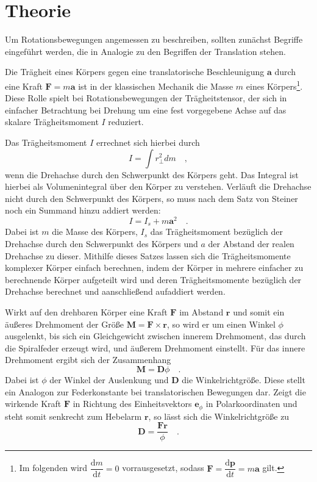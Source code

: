 \section{Theorie}
\label{sec:Theorie}
Um Rotationsbewegungen angemessen zu beschreiben, sollten zunächst Begriffe
eingeführt werden, die in Analogie zu den Begriffen der Translation stehen.

Die Trägheit eines Körpers gegen eine translatorische Beschleunigung $\symbf{a}$
durch eine Kraft $\symbf{F}=m\symbf{a}$ ist in der klassischen Mechanik die
Masse $m$ eines Körpers\footnote{Im folgenden wird
$\dfrac{\mathrm{d}m}{\mathrm{d}t}=0$ vorrausgesetzt, sodass
$\symbf{F}=\dfrac{\mathrm{d}\symbf{p}}{\mathrm{d}t}=m\symbf{a}$ gilt.}.
Diese Rolle spielt bei Rotationsbewegungen der Trägheitstensor, der sich in
einfacher Betrachtung bei Drehung um eine fest vorgegebene Achse auf das skalare
Trägheitsmoment $I$ reduziert.

Das Trägheitsmoment $I$ errechnet sich hierbei durch
\begin{equation}
  I=\int r_{\perp}^2 dm\quad,
  \label{eqn:traegheitallg}
\end{equation}
wenn die Drehachse durch den Schwerpunkt des Körpers geht. Das Integral ist hierbei
als Volumenintegral über den Körper zu verstehen. Verläuft die Drehachse nicht
durch den Schwerpunkt des Körpers, so muss nach dem Satz von Steiner noch ein
Summand hinzu addiert werden:
\begin{equation}
  I=I_s+m\symbf{a}^2\quad.
  \label{eqn:steiner}
\end{equation}
Dabei ist $m$ die Masse des Körpers, $I_s$ das Trägheitsmoment bezüglich
der Drehachse durch den Schwerpunkt des Körpers und $a$ der Abstand der realen
Drehachse zu dieser. Mithilfe dieses Satzes lassen sich die Trägheitsmomente
komplexer Körper einfach berechnen, indem der Körper in mehrere einfacher zu berechnende
Körper aufgeteilt wird und deren Trägheitsmomente bezüglich der Drehachse berechnet
und aanschließend aufaddiert werden.

Wirkt auf den drehbaren Körper eine Kraft $\symbf{F}$ im Abstand $\symbf{r}$ und somit ein
äußeres Drehmoment der Größe $\symbf{M}=\symbf{F}\times\symbf{r}$, so wird er um
einen Winkel $\phi$ ausgelenkt, bis sich ein Gleichgewicht zwischen innerem Drehmoment,
das durch die Spiralfeder erzeugt wird, und äußerem Drehmoment einstellt. Für das innere
Drehmoment ergibt sich der Zusammenhang
\begin{equation}
  \symbf{M}=\symbf{D}\phi\quad.
  \label{eqn:drehmoment_innen}
\end{equation}
Dabei ist $\phi$ der Winkel der Auslenkung und $\symbf{D}$ die Winkelrichtgröße.
Diese stellt ein Analogon zur Federkonstante bei translatorischen Bewegungen dar.
Zeigt die wirkende Kraft $\symbf{F}$ in Richtung des Einheitsvektors $\symbf{e}_{\phi}$
in Polarkoordinaten und steht somit senkrecht zum Hebelarm $\symbf{r}$, so lässt sich
die Winkelrichtgröße zu
\begin{equation}
  \symbf{D}=\frac{\symbf{F}\symbf{r}}{\phi}\quad.
  \label{eqn:winkelrg}
\end{equation}

